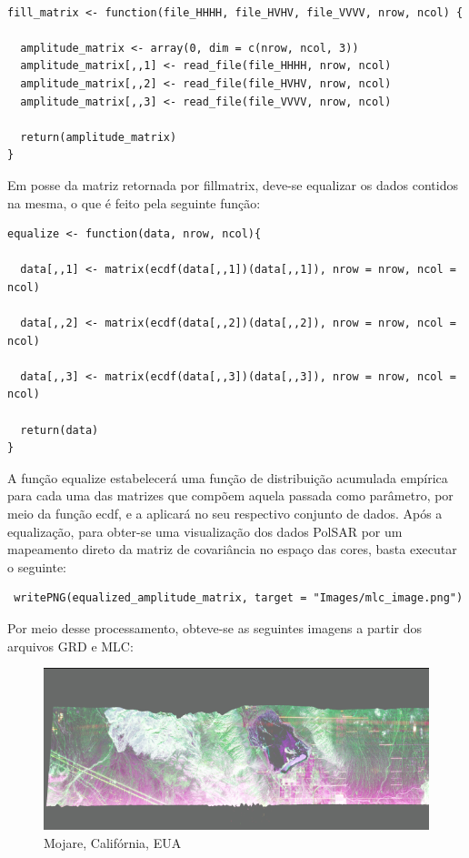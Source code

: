 \documentclass[12pt]{article}
\begin{document}
\begin{verbatim}

fill_matrix <- function(file_HHHH, file_HVHV, file_VVVV, nrow, ncol) {
  
  amplitude_matrix <- array(0, dim = c(nrow, ncol, 3))
  amplitude_matrix[,,1] <- read_file(file_HHHH, nrow, ncol)
  amplitude_matrix[,,2] <- read_file(file_HVHV, nrow, ncol)
  amplitude_matrix[,,3] <- read_file(file_VVVV, nrow, ncol)
  
  return(amplitude_matrix) 
}
\end{verbatim}

Em posse da matriz retornada por fill\textunderscore matrix, deve-se equalizar os dados contidos na mesma, o que é feito pela seguinte função:

\begin{verbatim}
equalize <- function(data, nrow, ncol){
  
  data[,,1] <- matrix(ecdf(data[,,1])(data[,,1]), nrow = nrow, ncol = ncol)
  
  data[,,2] <- matrix(ecdf(data[,,2])(data[,,2]), nrow = nrow, ncol = ncol)
  
  data[,,3] <- matrix(ecdf(data[,,3])(data[,,3]), nrow = nrow, ncol = ncol)  
  
  return(data)
}
\end{verbatim}

A função equalize estabelecerá uma função de distribuição acumulada empírica para cada uma das matrizes que compõem aquela passada como parâmetro, por meio da função ecdf, e a aplicará no seu respectivo conjunto de dados. Após a equalização, para obter-se uma visualização dos dados PolSAR por um mapeamento direto da matriz de covariância no espaço das cores, basta executar o seguinte:

\begin{verbatim}
 writePNG(equalized_amplitude_matrix, target = "Images/mlc_image.png")
\end{verbatim}

Por meio desse processamento, obteve-se as seguintes imagens a partir dos arquivos GRD e MLC:

\begin{figure}[!ht]
	\begin{center}
		\includegraphics[width = 120mm, scale = 0.5]{../../Images/Report_07_18/grd_image_low_resolution} \\ 
        Mojare, Califórnia, EUA\\
	\end{center}
\end{figure}
\end{document}
